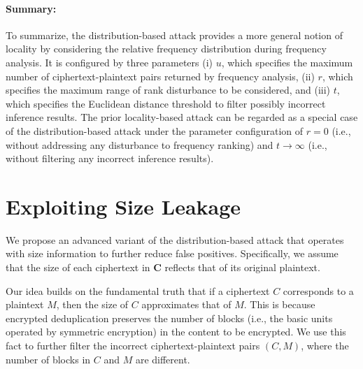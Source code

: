 \documentclass[bachelor]{thesis-uestc}
\begin{document}
\paragraph{Summary:} To summarize, the distribution-based attack provides a
more general notion of locality by considering the relative frequency
distribution during frequency analysis.  It is configured by three parameters
(i) $u$, which specifies the maximum number of ciphertext-plaintext pairs returned by frequency analysis, 
(ii) $r$, which specifies the maximum range of rank disturbance to be
considered, and (iii) $t$, which specifies the Euclidean distance threshold to
filter possibly incorrect inference results. 
The prior locality-based attack \cite{li17} can be regarded as a special case
of the distribution-based attack under the parameter configuration of $r = 0$
(i.e., without addressing any disturbance to frequency ranking) and 
$t\rightarrow\infty$ (i.e., without filtering any incorrect inference results).     
 
 
 



\section{Exploiting Size Leakage}

We propose an advanced variant of the distribution-based attack that operates with size information to further reduce false positives. Specifically, we assume that the size of each ciphertext in $\mathbf{C}$ reflects that of its original plaintext.   



Our idea builds on the fundamental truth that if a ciphertext $C$ corresponds to a plaintext $M$, then the size of $C$ approximates that of $M$. This is because encrypted deduplication preserves the number of blocks (i.e., the basic units operated by symmetric encryption) in the content to be encrypted. We use this fact to further filter the incorrect ciphertext-plaintext pairs $(C, M)$, where the number of blocks in $C$ and $M$ are different.  
\end{document}
